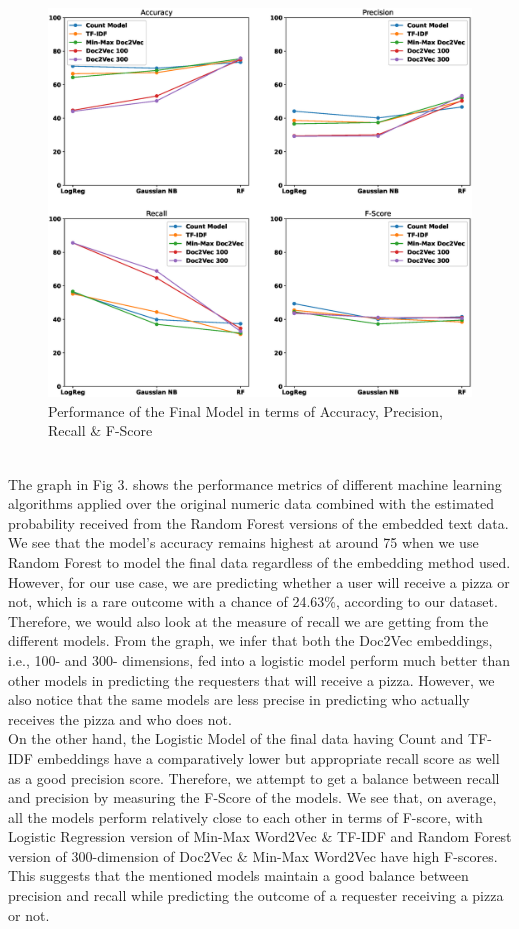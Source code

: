 \documentclass[conference]{IEEEtran}
\begin{document}
\begin{figure}
\includegraphics[width=\linewidth]{Final_Model_Performance.eps}
\caption{Performance of the Final Model in terms of Accuracy, Precision, Recall \& F-Score} \label{fig3}
\end{figure}
\\ The graph in Fig 3. shows the performance metrics of different machine learning algorithms applied over the original numeric data combined with the estimated probability received from the Random Forest versions of the embedded text data. We see that the model’s accuracy remains highest at around 75 when we use Random Forest to model the final data regardless of the embedding method used. However, for our use case, we are predicting whether a user will receive a pizza or not, which is a rare outcome with a chance of 24.63\%, according to our dataset. Therefore, we would also look at the measure of recall we are getting from the different models. From the graph, we infer that both the Doc2Vec embeddings, i.e., 100- and 300- dimensions, fed into a logistic model perform much better than other models in predicting the requesters that will receive a pizza. However, we also notice that the same models are less precise in predicting who actually receives the pizza and who does not.\\
On the other hand, the Logistic Model of the final data having Count and TF-IDF embeddings have a comparatively lower but appropriate recall score as well as a good precision score. Therefore, we attempt to get a balance between recall and precision by measuring the F-Score of the models. We see that, on average, all the models perform relatively close to each other in terms of F-score, with Logistic Regression version of Min-Max Word2Vec \& TF-IDF and Random Forest version of 300-dimension of Doc2Vec \& Min-Max Word2Vec have high F-scores. This suggests that the mentioned models maintain a good balance between precision and recall while predicting the outcome of a requester receiving a pizza or not.\\
\end{document}
